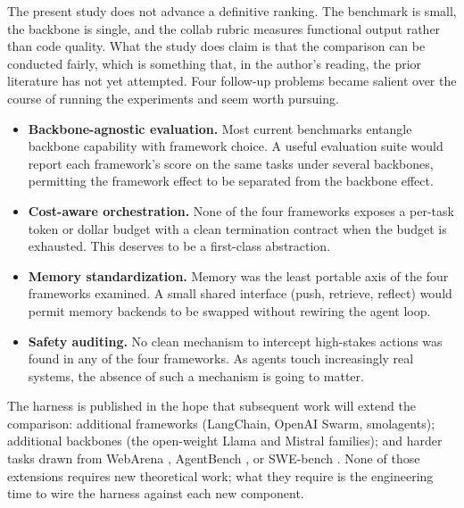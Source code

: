 \documentclass[conference]{IEEEtran}
\begin{document}
The present study does not advance a definitive ranking. The
benchmark is small, the backbone is single, and the collab rubric
measures functional output rather than code quality. What the study
does claim is that the comparison can be conducted fairly, which is
something that, in the author's reading, the prior literature has not
yet attempted. Four follow-up problems became salient over the course
of running the experiments and seem worth pursuing.
\begin{itemize}[leftmargin=*]
\item \textbf{Backbone-agnostic evaluation.} Most current benchmarks
entangle backbone capability with framework choice. A useful
evaluation suite would report each framework's score on the same
tasks under several backbones, permitting the framework effect to be
separated from the backbone effect.
\item \textbf{Cost-aware orchestration.} None of the four frameworks
exposes a per-task token or dollar budget with a clean termination
contract when the budget is exhausted. This deserves to be a
first-class abstraction.
\item \textbf{Memory standardization.} Memory was the least portable
axis of the four frameworks examined. A small shared interface (push,
retrieve, reflect) would permit memory backends to be swapped without
rewiring the agent loop.
\item \textbf{Safety auditing.} No clean mechanism to intercept
high-stakes actions was found in any of the four frameworks. As
agents touch increasingly real systems, the absence of such a
mechanism is going to matter.
\end{itemize}

The harness is published in the hope that subsequent work will extend
the comparison: additional frameworks (LangChain, OpenAI Swarm,
smolagents); additional backbones (the open-weight Llama and Mistral
families); and harder tasks drawn from WebArena
\cite{zhou2024webarena}, AgentBench \cite{liu2024agentbench}, or
SWE-bench \cite{yang2024sweagent}. None of those extensions requires
new theoretical work; what they require is the engineering time to
wire the harness against each new component.



\end{document}

